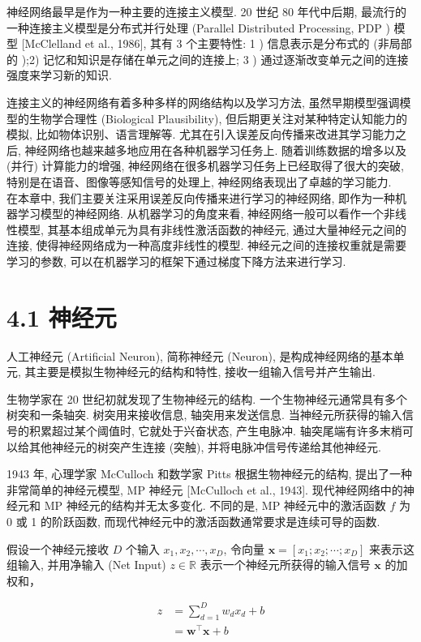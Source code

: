 \documentclass[10pt]{article}
\begin{document}
神经网络最早是作为一种主要的连接主义模型. 20 世纪 80 年代中后期, 最流行的一种连接主义模型是分布式并行处理 (Parallel Distributed Processing, PDP ) 模型 [McClelland et al., 1986], 其有 3 个主要特性: 1 ) 信息表示是分布式的 (非局部的 );2) 记忆和知识是存储在单元之间的连接上; 3 ) 通过逐渐改变单元之间的连接强度来学习新的知识.

连接主义的神经网络有着多种多样的网络结构以及学习方法, 虽然早期模型强调模型的生物学合理性 (Biological Plausibility), 但后期更关注对某种特定认知能力的模拟, 比如物体识别、语言理解等. 尤其在引入误差反向传播来改进其学习能力之后, 神经网络也越来越多地应用在各种机器学习任务上. 随着训练数据的增多以及 (并行) 计算能力的增强, 神经网络在很多机器学习任务上已经取得了很大的突破, 特别是在语音、图像等感知信号的处理上, 神经网络表现出了卓越的学习能力.\\
在本章中, 我们主要关注采用误差反向传播来进行学习的神经网络, 即作为一种机器学习模型的神经网络. 从机器学习的角度来看, 神经网络一般可以看作一个非线性模型, 其基本组成单元为具有非线性激活函数的神经元, 通过大量神经元之间的连接, 使得神经网络成为一种高度非线性的模型. 神经元之间的连接权重就是需要学习的参数, 可以在机器学习的框架下通过梯度下降方法来进行学习.

\section*{4.1 神经元}
人工神经元 (Artificial Neuron), 简称神经元 (Neuron), 是构成神经网络的基本单元, 其主要是模拟生物神经元的结构和特性, 接收一组输入信号并产生输出.

生物学家在 20 世纪初就发现了生物神经元的结构. 一个生物神经元通常具有多个树突和一条轴突. 树突用来接收信息, 轴突用来发送信息. 当神经元所获得的输入信号的积累超过某个阈值时, 它就处于兴奋状态, 产生电脉冲. 轴突尾端有许多末梢可以给其他神经元的树突产生连接 (突触), 并将电脉冲信号传递给其他神经元.

1943 年, 心理学家 McCulloch 和数学家 Pitts 根据生物神经元的结构, 提出了一种非常简单的神经元模型, MP 神经元 [McCulloch et al., 1943]. 现代神经网络中的神经元和 MP 神经元的结构并无太多变化. 不同的是, MP 神经元中的激活函数 $f$ 为 0 或 1 的阶跃函数, 而现代神经元中的激活函数通常要求是连续可导的函数.

假设一个神经元接收 $D$ 个输入 $x_{1}, x_{2}, \cdots, x_{D}$, 令向量 $\boldsymbol{x}=\left[x_{1} ; x_{2} ; \cdots ; x_{D}\right]$ 来表示这组输入, 并用净输入 (Net Input) $z \in \mathbb{R}$ 表示一个神经元所获得的输入信号 $\boldsymbol{x}$ 的加权和，


\begin{align*}
z & =\sum_{d=1}^{D} w_{d} x_{d}+b  \tag{4.1}\\
& =\boldsymbol{w}^{\top} \boldsymbol{x}+b \tag{4.2}
\end{align*}
\end{document}
